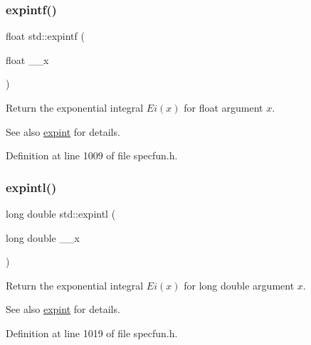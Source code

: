 \subsubsection{\texorpdfstring{expintf()}{expintf()}}
{\footnotesize\ttfamily float std\+::expintf (\begin{DoxyParamCaption}\item[{float}]{\+\_\+\+\_\+x }\end{DoxyParamCaption})\hspace{0.3cm}{\ttfamily [inline]}}

Return the exponential integral $ Ei(x) $ for {\ttfamily float} argument $ x $.

\begin{DoxySeeAlso}{See also}
\hyperlink{group__tr29124__math__spec__func_gac6d12da409bbd0e41dd1f7cdb3317252}{expint} for details. 
\end{DoxySeeAlso}


Definition at line 1009 of file specfun.\+h.

\mbox{\label{group__tr29124__math__spec__func_ga1329130b32328d0666e290ee5931fa4f}} 
\subsubsection{\texorpdfstring{expintl()}{expintl()}}
{\footnotesize\ttfamily long double std\+::expintl (\begin{DoxyParamCaption}\item[{long double}]{\+\_\+\+\_\+x }\end{DoxyParamCaption})\hspace{0.3cm}{\ttfamily [inline]}}

Return the exponential integral $ Ei(x) $ for {\ttfamily long double} argument $ x $.

\begin{DoxySeeAlso}{See also}
\hyperlink{group__tr29124__math__spec__func_gac6d12da409bbd0e41dd1f7cdb3317252}{expint} for details. 
\end{DoxySeeAlso}


Definition at line 1019 of file specfun.\+h.

\mbox{\label{group__tr29124__math__spec__func_gaded38c372f2977d30b613bd55426f132}} 
